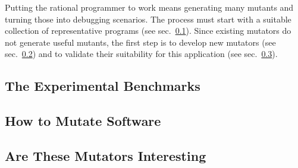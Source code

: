 
Putting the rational programmer to work means generating many mutants and turning
those into debugging scenarios. The process must start with a suitable
collection of representative programs (see sec.~\ref{sub:mutate-benchmarks}).
Since existing mutators do not generate useful mutants, the first step is to
develop new mutators (see sec.~\ref{sub:mutate-mutators}) and to validate their
suitability for this application (see sec.~\ref{sub:mutate-interesting}).


\def\sub#1#2{\subsection{#2} \label{sub:mutate-#1} }


\sub{benchmarks}{The Experimental Benchmarks}

\sub{mutators}   {How to Mutate Software} 
\sub{interesting}{Are These Mutators Interesting} 

